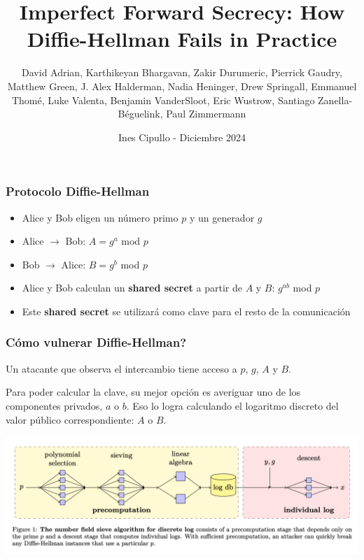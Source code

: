 \documentclass{beamer}
\title[Imperfect Forward Secrecy] %
{Imperfect Forward Secrecy: \newline How Diffie-Hellman Fails in Practice}
\subtitle{}
\author[Ines Cipullo] %
{David Adrian, Karthikeyan Bhargavan, Zakir Durumeric, Pierrick Gaudry, Matthew Green,
J. Alex Halderman, Nadia Heninger, Drew Springall, Emmanuel Thomé, Luke Valenta,
Benjamin VanderSloot, Eric Wustrow, Santiago Zanella-Béguelink, Paul Zimmermann}
\institute[LCC - FCEIA] %
{
  Facultad de Ciencias Exactas, Ingeniería y Agrimensura,\\
  Universidad Nacional de Rosario.
}
\date[]{Ines Cipullo - Diciembre 2024}
\begin{document}
\frame{
    \titlepage
}


\begin{frame}
\frametitle{Protocolo Diffie-Hellman}
    \begin{itemize}
        \item<1-> Alice y Bob eligen un número primo $p$ y un generador $g$ %
        \item<1-> Alice $\rightarrow$ Bob: $A = g^a$ mod $p$
        \item<1-> Bob $\rightarrow$ Alice: $B = g^b$ mod $p$
        \item<1-> Alice y Bob calculan un \textbf{shared secret} a partir de $A$ y $B$: $g^{ab}$ mod $p$
        \item<1-> Este \textbf{shared secret} se utilizará como clave para el resto de la comunicación
    \end{itemize}
\end{frame}

\begin{frame}
\frametitle{Cómo vulnerar Diffie-Hellman?}
    Un atacante que observa el intercambio tiene acceso a $p$, $g$, $A$ y $B$.

    Para poder calcular la clave, su mejor opción es averiguar uno de los componentes privados, $a$ o $b$. Eso lo logra calculando el logaritmo discreto del valor público correspondiente: $A$ o $B$.

    \begin{center}
        \includegraphics[scale=0.3]{figure1_dh.png}
    \end{center}
\end{frame}
\end{document}
